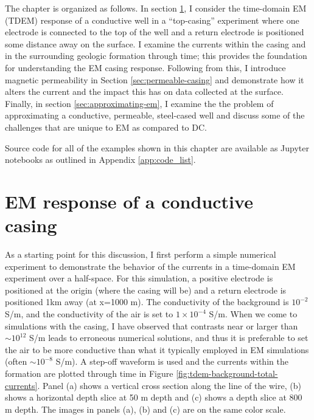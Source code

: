 The chapter is organized as follows. In section \ref{sec:TDEM-casing}, I consider the time-domain EM (TDEM) response of a conductive well in a ``top-casing'' experiment where one electrode is connected to the top of the well and a return electrode is positioned some distance away on the surface. I examine the currents within the casing and in the surrounding geologic formation through time; this provides the foundation for understanding the EM casing response. Following from this, I introduce magnetic permeability in Section \ref{sec:permeable-casing} and demonstrate how it alters the current and the impact this has on data collected at the surface. Finally, in section \ref{sec:approximating-em}, I examine the the problem of approximating a conductive, permeable, steel-cased well and discuss some of the challenges that are unique to EM as compared to DC.

Source code for all of the examples shown in this chapter are available as Jupyter notebooks as outlined in Appendix \ref{app:code_list}.


\section{EM response of a conductive casing}
\label{sec:TDEM-casing}

As a starting point for this discussion, I first perform a simple numerical experiment to demonstrate the behavior of the currents in a time-domain EM experiment over a half-space. For this simulation, a positive electrode is positioned at the origin (where the casing will be)  and a return electrode is positioned 1km away (at x=1000 m). The conductivity of the background is $10^{-2}$ S/m, and the conductivity of the air is set to $1 \times 10^{-4}$ S/m. When we come to simulations with the casing, I have observed that contrasts near or larger than $\sim 10^{12}$ S/m leads to erroneous numerical solutions, and thus it is preferable to set the air to be more conductive than what it typically employed in EM simulations (often $\sim 10^{-8}$ S/m). A step-off waveform is used and the currents within the formation are plotted through time in Figure \ref{fig:tdem-background-total-currents}. Panel (a) shows a vertical cross section along the line of the wire, (b) shows a horizontal depth slice at 50 m depth and (c) shows a depth slice at 800 m depth. The images in panels (a), (b) and (c) are on the same color scale.




